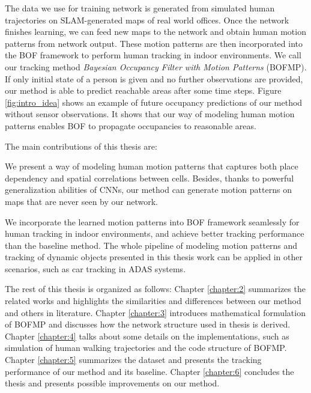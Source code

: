 The data we use for training network is generated from simulated human trajectories on SLAM-generated maps of real world offices. Once the network finishes learning, we can feed new maps to the network and obtain human motion patterns from network output. These motion patterns are then incorporated into the BOF framework to perform human tracking in indoor environments. We call our tracking method \textit{Bayesian Occupancy Filter with Motion Patterns} (BOFMP). If only initial state of a person is given and no further observations are provided, our method is able to predict reachable areas after some time steps. Figure \ref{fig:intro_idea} shows an example of future occupancy predictions of our method without sensor observations. It shows that our way of modeling human motion patterns enables BOF to propagate occupancies to reasonable areas.

The main contributions of this thesis are:

\begin{my_enumerate}
\item We present a way of modeling human motion patterns that captures both place dependency and spatial correlations between cells. Besides, thanks to powerful generalization abilities of CNNs, our method can generate motion patterns on maps that are never seen by our network.
\item We incorporate the learned motion patterns into BOF framework seamlessly for human tracking in indoor environments, and achieve better tracking performance than the baseline method.  The whole pipeline of modeling motion patterns and tracking of dynamic objects presented in this thesis work can be applied in other scenarios, such as car tracking in ADAS systems.
\end{my_enumerate}


The rest of this thesis is organized as follows: Chapter \ref{chapter:2} summarizes the related works and highlights the similarities and differences between our method and others in literature. Chapter \ref{chapter:3} introduces mathematical formulation of BOFMP and discusses how the network structure used in thesis is derived. Chapter \ref{chapter:4} talks about some details on the implementations, such as simulation of human walking trajectories and the code structure of BOFMP. Chapter \ref{chapter:5} summarizes the dataset and presents the tracking performance of our method and its baseline. Chapter \ref{chapter:6} concludes the thesis and presents possible improvements on our method. 
